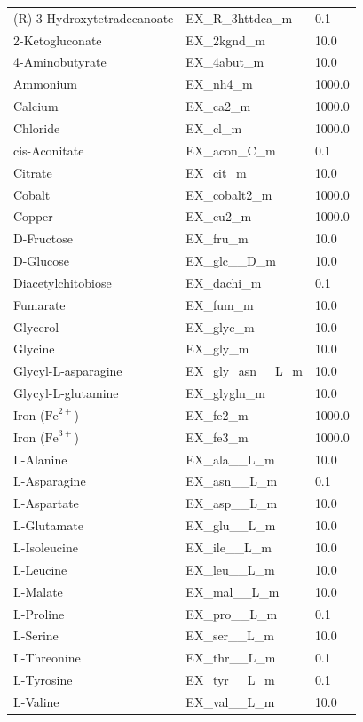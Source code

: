 \begin{longtable}{lll}
	\bottomrule
	\endlastfoot
		(R)-3-Hydroxytetradecanoate & EX\_R\_3httdca\_m & 0.1 \\
		2-Ketogluconate & EX\_2kgnd\_m & 10.0 \\
		4-Aminobutyrate & EX\_4abut\_m & 10.0 \\
		Ammonium & EX\_nh4\_m & 1000.0 \\
		Calcium & EX\_ca2\_m & 1000.0 \\
		Chloride & EX\_cl\_m & 1000.0 \\
		cis-Aconitate & EX\_acon\_C\_m & 0.1 \\
		Citrate & EX\_cit\_m & 10.0 \\
		Cobalt & EX\_cobalt2\_m & 1000.0 \\
		Copper & EX\_cu2\_m & 1000.0 \\
		D-Fructose & EX\_fru\_m & 10.0 \\
		D-Glucose & EX\_glc\_\_D\_m & 10.0 \\
		Diacetylchitobiose & EX\_dachi\_m & 0.1 \\
		Fumarate & EX\_fum\_m & 10.0 \\
		Glycerol & EX\_glyc\_m & 10.0 \\
		Glycine & EX\_gly\_m & 10.0 \\
		Glycyl-L-asparagine & EX\_gly\_asn\_\_L\_m & 10.0 \\
		Glycyl-L-glutamine & EX\_glygln\_m & 10.0 \\
		Iron ($\text{Fe}^{2+}$) & EX\_fe2\_m & 1000.0 \\
		Iron ($\text{Fe}^{3+}$) & EX\_fe3\_m & 1000.0 \\
		L-Alanine & EX\_ala\_\_L\_m & 10.0 \\
		L-Asparagine & EX\_asn\_\_L\_m & 0.1 \\
		L-Aspartate & EX\_asp\_\_L\_m & 10.0 \\
		L-Glutamate & EX\_glu\_\_L\_m & 10.0 \\
		L-Isoleucine & EX\_ile\_\_L\_m & 10.0 \\
		L-Leucine & EX\_leu\_\_L\_m & 10.0 \\
		L-Malate & EX\_mal\_\_L\_m & 10.0 \\
		L-Proline & EX\_pro\_\_L\_m & 0.1 \\
		L-Serine & EX\_ser\_\_L\_m & 10.0 \\
		L-Threonine & EX\_thr\_\_L\_m & 0.1 \\
		L-Tyrosine & EX\_tyr\_\_L\_m & 0.1 \\
		L-Valine & EX\_val\_\_L\_m & 10.0 \\

\end{longtable}

